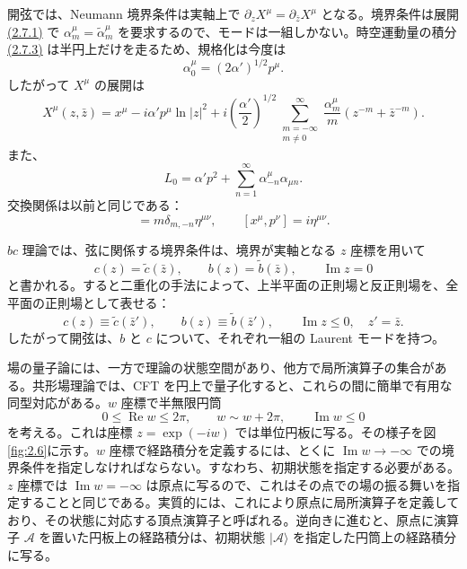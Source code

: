 
開弦では、Neumann 境界条件は実軸上で $\partial_zX^\mu=\partial_{\bar z}X^\mu$ となる。境界条件は展開 \hyperref[eq:2.7.1]{(2.7.1)} で $\alpha_m^\mu=\widetilde\alpha_m^\mu$ を要求するので、モードは一組しかない。時空運動量の積分 \hyperref[eq:2.7.3]{(2.7.3)} は半円上だけを走るため、規格化は今度は
\begin{equation}
\alpha_0^\mu=(2\alpha')^{1/2}p^\mu.
\tag{2.7.25}\label{eq:2.7.25}
\end{equation}
したがって $X^\mu$ の展開は
\begin{equation}
X^\mu(z,\bar z)=x^\mu-i\alpha'p^\mu\ln|z|^2
+i\left(\frac{\alpha'}2\right)^{1/2}
\sum_{\substack{m=-\infty\\m\ne0}}^\infty
\frac{\alpha_m^\mu}{m}(z^{-m}+\bar z^{-m}).
\tag{2.7.26}\label{eq:2.7.26}
\end{equation}
また、
\begin{equation}
L_0=\alpha'p^2+\sum_{n=1}^\infty\alpha_{-n}^\mu\alpha_{\mu n}.
\tag{2.7.27}\label{eq:2.7.27}
\end{equation}
交換関係は以前と同じである：
\begin{equation}
[\alpha_m^\mu,\alpha_n^\nu]=m\delta_{m,-n}\eta^{\mu\nu},
\qquad [x^\mu,p^\nu]=i\eta^{\mu\nu}.
\tag{2.7.28}\label{eq:2.7.28}
\end{equation}

$bc$ 理論では、弦に関係する境界条件は、境界が実軸となる $z$ 座標を用いて
\begin{equation}
c(z)=\widetilde c(\bar z),\qquad
b(z)=\widetilde b(\bar z),\qquad\operatorname{Im}z=0
\tag{2.7.29}\label{eq:2.7.29}
\end{equation}
と書かれる。すると二重化の手法によって、上半平面の正則場と反正則場を、全平面の正則場として表せる：
\begin{equation}
c(z)\equiv\widetilde c(\bar z'),\qquad
b(z)\equiv\widetilde b(\bar z'),\qquad
\operatorname{Im}z\leq0,\quad z'=\bar z.
\tag{2.7.30}\label{eq:2.7.30}
\end{equation}
したがって開弦は、$b$ と $c$ について、それぞれ一組の Laurent モードを持つ。

\label{sec:2.8}

場の量子論には、一方で理論の状態空間があり、他方で局所演算子の集合がある。共形場理論では、CFT を円上で量子化すると、これらの間に簡単で有用な同型対応がある。$w$ 座標で半無限円筒
\begin{equation}
0\leq\operatorname{Re}w\leq2\pi,\qquad
w\sim w+2\pi,\qquad \operatorname{Im}w\leq0
\tag{2.8.1}\label{eq:2.8.1}
\end{equation}
を考える。これは座標 $z=\exp(-iw)$ では単位円板に写る。その様子を図\ref{fig:2.6}に示す。$w$ 座標で経路積分を定義するには、とくに $\operatorname{Im}w\to-\infty$ での境界条件を指定しなければならない。すなわち、初期状態を指定する必要がある。$z$ 座標では $\operatorname{Im}w=-\infty$ は原点に写るので、これはその点での場の振る舞いを指定することと同じである。実質的には、これにより原点に局所演算子を定義しており、その状態に対応する頂点演算子と呼ばれる。逆向きに進むと、原点に演算子 $\mathcal A$ を置いた円板上の経路積分は、初期状態 $\lvert\mathcal A\rangle$ を指定した円筒上の経路積分に写る。

